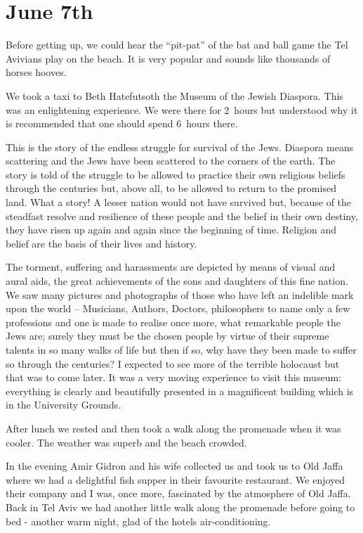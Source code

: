\section{June 7th}

Before getting up, we could hear the ``pit-pat'' of the bat and ball
game the Tel Avivians play on the beach. It is very popular and sounds
like thousands of horses hooves.

We took a taxi to Beth Hatefutsoth the Museum of the Jewish
Diaspora. This was an enlightening experience. We were there for
2~hours but understood why it is recommended that one should spend
6~hours there.

This is the story of the endless struggle for survival of the
Jews. Diaspora means scattering and the Jews have been scattered to
the corners of the earth. The story is told of the struggle to be
allowed to practice their own religious beliefs through the centuries
but, above all, to be allowed to return to the promised land. What a
story! A lesser nation would not have survived but, because of the
steadfast resolve and resilience of these people and the belief in
their own destiny, they have risen up again and again since the
beginning of time. Religion and belief are the basis of their lives
and history.

The torment, suffering and harassments are depicted by means of
visual and aural aids, the great achievements of the sons and
daughters of this fine nation. We saw many pictures and photographs of
those who have left an indelible mark upon the world -- Musicians,
Authors, Doctors, philosophers to name only a few professions and one
is made to realise once more, what remarkable people the Jews are;
surely they must be the chosen people by virtue of their supreme
talents in so many walks of life but then if so, why have they been
made to suffer so through the centuries? I expected to see more of the
terrible holocaust but that was to come later. It was a very moving
experience to visit this museum: everything is clearly and beautifully
presented in a magnificent building which is in the University
Grounds.

After lunch we rested and then took a walk along the promenade when it
was cooler. The weather was superb and the beach crowded.

In the evening Amir Gidron and his wife collected us and took us to Old
Jaffa where we had a delightful fish supper in their favourite
restaurant. We enjoyed their company and I was, once more, fascinated
by the atmosphere of Old Jaffa. Back in Tel Aviv we had another little
walk along the promenade before going to bed - another warm night, glad
of the hotels air-conditioning.


